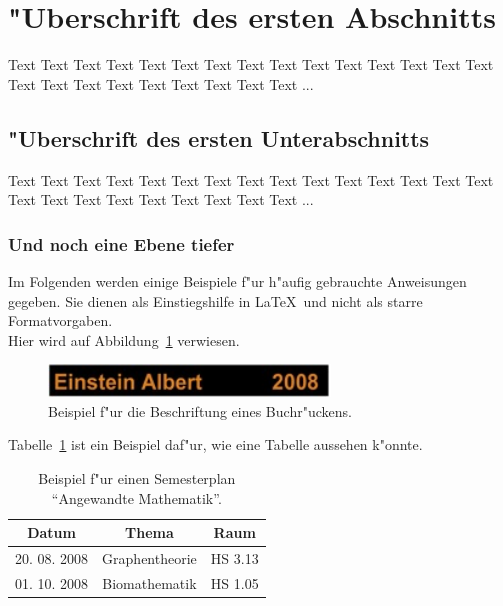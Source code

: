 \documentclass[a4paper,bibtotoc,oneside]{scrbook}
\begin{document}
\section[Erster Abschnitt]{"Uberschrift des ersten Abschnitts}

Text Text Text Text Text Text Text Text Text Text Text Text Text Text Text Text Text Text Text Text Text Text Text Text ...

\subsection[Erster Unterabschnitt]{"Uberschrift des ersten Unterabschnitts}

Text Text Text Text Text Text Text Text Text Text Text Text Text Text Text Text Text Text Text Text Text Text Text Text ...

\subsubsection[Erster Unter-Unterabschnitt]{Und noch eine Ebene tiefer}

Im Folgenden werden einige Beispiele f"ur h"aufig gebrauchte Anweisungen gegeben. Sie dienen als Einstiegshilfe in
\LaTeX\ und
nicht als starre Formatvorgaben.
\\[2\baselineskip]
Hier wird auf Abbildung~\ref{Abb1} verwiesen.
\begin{figure}[htbp]
\centering
\includegraphics[width=75mm]{./picture/Buchruecken}
\caption[Beschriftung eines Buchr"uckens.]{Beispiel f"ur die Beschriftung eines Buchr"uckens.}\label{Abb1}
\end{figure}
Tabelle~\ref{Tab1} ist ein Beispiel daf"ur, wie eine Tabelle aussehen k"onnte.
\begin{table}[htbp]
\centering
\begin{tabular}{ | c | c | c | }\hline
{\bf Datum} & {\bf Thema} & {\bf Raum}\\ \hline
\hline
20. 08. 2008 & Graphentheorie & HS 3.13\\ \hline
01. 10. 2008 & Biomathematik & HS 1.05\\ \hline
\end{tabular}
\caption[Semesterplan "`Angewandte Mathematik"'.]{Beispiel f"ur einen Semesterplan "`Angewandte Mathematik"'.}\label{Tab1}
\end{table}
\end{document}
